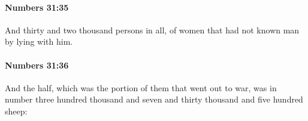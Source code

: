 		\paragraph{Numbers 31:35} %
			\label{NUMBERS-31-35}

			And thirty and two thousand persons in all, of women that had not known man by lying with him.


		\paragraph{Numbers 31:36} %
			\label{NUMBERS-31-36}

			And the half, which was the portion of them that went out to war, was in number three hundred thousand and seven and thirty thousand and five hundred sheep:


